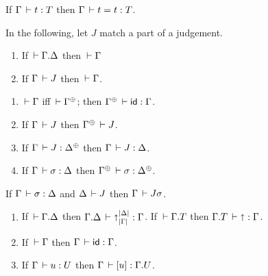\documentclass[acmlarge,review,anonymous]{acmart}\settopmatter{printfolios=true}
\begin{document}
\begin{lemma}[Reflexivity]
  If\/ $\Gamma \,\vdash t : T$ then $\Gamma \,\vdash t = t : T$.
\end{lemma}

In the following, let $J$ %
match a part of a judgement.

\begin{lemma}
\label{lem:cxtwf}\bla
  \begin{enumerate}
  \item If $\,\vdash \Gamma. \Delta$ then $\,\vdash \Gamma$
  \item If\/ $\Gamma \,\vdash J$ then $\,\vdash \Gamma$.
  \end{enumerate}
\end{lemma}

\begin{lemma}[Resurrection]
\label{lem:res} \bla
\begin{enumerate}
\item $\,\vdash \Gamma$ iff $\der \resurrect\Gamma$;  then $\resurrect \Gamma \der \sid : \Gamma$.
\item If\/ $\Gamma \,\vdash J$ then $\resurrect \Gamma \der J$.
\item If\/ $\Gamma \der J : \resurrect \Delta$ %
  then $\Gamma \,\vdash J : \Delta$.
\item If\/ $\Gamma \,\vdash \sigma : \Delta$ %
  then $\resurrect\Gamma \der \sigma : \resurrect\Delta$.
\end{enumerate}
\end{lemma}

\begin{lemma}[Substitution]
\label{lem:sub}\bla
  If\/ $\Gamma \,\vdash \sigma : \Delta$ and $\Delta \,\vdash J$ then $\Gamma \,\vdash J\sigma$.
\end{lemma}

\begin{lemma}
\label{lem:specsub}\bla
\begin{enumerate}
\item If $\,\vdash \Gamma. \Delta$ then $\Gamma. \Delta \,\vdash \mathord{\shortuparrow}_{|\Gamma|}^{|\Delta|} : \Gamma$.
      If $\,\vdash \Gamma. T$ then $\Gamma. T \,\vdash \mathord{\shortuparrow} : \Gamma$.
\item If $\,\vdash \Gamma$ then $\Gamma \,\vdash \mathsf{id} : \Gamma$.
\item If $\Gamma \,\vdash u : U$ then $\Gamma \,\vdash [u] : \Gamma. U$.
\end{enumerate}
\end{lemma}
\end{document}
